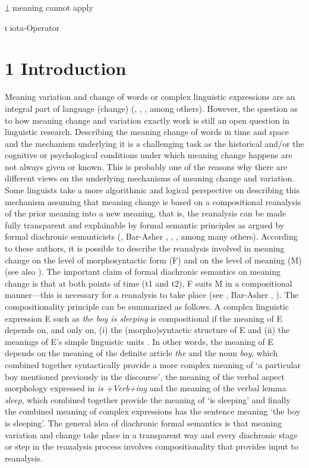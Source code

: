 \documentclass[output=paper]{langscibook}
\begin{document}
⏊    meaning cannot apply

ι     iota-Operator

\section{1 Introduction}

Meaning variation and change of words or complex linguistic expressions are an integral part of language (change) (\citealt{Blank1997}, \citealt{Traugott1989}, \citealt{Eckardt2006}, among others). However, the question as to how meaning change and variation exactly work is still an open question in linguistic research. Describing the meaning change of words in time and space and the mechanism underlying it is a challenging task as the historical and/or the cognitive or psychological conditions under which meaning change happens are not always given or known. This is probably one of the reasons why there are different views on the underlying mechanisms of meaning change and variation. Some linguists take a more algorithmic and logical perspective on describing this mechanism assuming that meaning change is based on a compositional reanalysis of the prior meaning into a new meaning, that is, the reanalysis can be made fully transparent and explainable by formal semantic principles as argued by formal diachronic semanticists (\citealt{Eckardt2006}, Bar-Asher \citealt{Siegal2015}, \citealt{Condoravdi2015}, \citealt{Aloni2021}, among many others). According to these authors, it is possible to describe the reanalysis involved in meaning change on the level of morphosyntactic form (F) and on the level of meaning (M) (see also \citealt{DetgersEtAl2021}). The important claim of formal diachronic semantics on meaning change is that at both points of time (t1 and t2), F suits M in a compositional manner—this is necessary for a reanalysis to take place (see \citealt{Eckardt2006}, Bar-Asher \citealt{Siegal2015}, \citealt{Aloni2021}). The compositionality principle can be summarized as follows. A complex linguistic expression E such as \textit{the boy is sleeping} is compositional if the meaning of E depends on, and only on, (i) the (morpho)syntactic structure of E and (ii) the meanings of E’s simple linguistic units \citep{Frege1997}. In other words, the meaning of E depends on the meaning of the definite article \textit{the} and the noun \textit{boy}, which combined together syntactically provide a more complex meaning of ‘a particular boy mentioned previously in the discourse’, the meaning of the verbal aspect morphology expressed in \textit{is +Verb+ing} and the meaning of the verbal lemma \textit{sleep}, which combined together provide the meaning of ‘is sleeping’ and finally the combined meaning of complex expressions has the sentence meaning ‘the boy is sleeping’. The general idea of diachronic formal semantics is that meaning variation and change take place in a transparent way and every diachronic stage or step in the reanalysis process involves compositionality that provides input to reanalysis.
\end{document}

